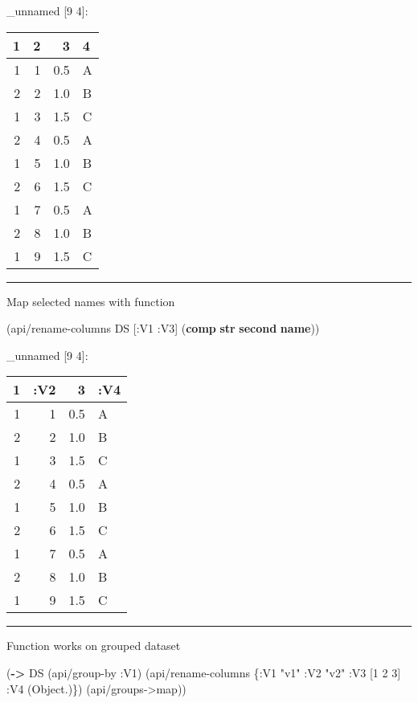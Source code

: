 \documentclass[]{article}
\newenvironment{Shaded}{\begin{snugshade}}{\end{snugshade}}
\newcommand{\KeywordTok}[1]{\textcolor[rgb]{0.13,0.29,0.53}{\textbf{#1}}}
\newcommand{\DecValTok}[1]{\textcolor[rgb]{0.00,0.00,0.81}{#1}}
\newcommand{\StringTok}[1]{\textcolor[rgb]{0.31,0.60,0.02}{#1}}
\newcommand{\AttributeTok}[1]{\textcolor[rgb]{0.77,0.63,0.00}{#1}}
\newcommand{\NormalTok}[1]{#1}
\begin{document}
\_unnamed {[}9 4{]}:

\begin{longtable}[]{@{}rrrl@{}}
\toprule
1 & 2 & 3 & 4\tabularnewline
\midrule
\endhead
1 & 1 & 0.5 & A\tabularnewline
2 & 2 & 1.0 & B\tabularnewline
1 & 3 & 1.5 & C\tabularnewline
2 & 4 & 0.5 & A\tabularnewline
1 & 5 & 1.0 & B\tabularnewline
2 & 6 & 1.5 & C\tabularnewline
1 & 7 & 0.5 & A\tabularnewline
2 & 8 & 1.0 & B\tabularnewline
1 & 9 & 1.5 & C\tabularnewline
\bottomrule
\end{longtable}

\begin{center}\rule{0.5\linewidth}{0.5pt}\end{center}

Map selected names with function

\begin{Shaded}
\begin{Highlighting}[]
\NormalTok{(api/rename-columns DS [}\AttributeTok{:V1} \AttributeTok{:V3}\NormalTok{] (}\KeywordTok{comp} \KeywordTok{str} \KeywordTok{second} \KeywordTok{name}\NormalTok{))}
\end{Highlighting}
\end{Shaded}

\_unnamed {[}9 4{]}:

\begin{longtable}[]{@{}rrrl@{}}
\toprule
1 & :V2 & 3 & :V4\tabularnewline
\midrule
\endhead
1 & 1 & 0.5 & A\tabularnewline
2 & 2 & 1.0 & B\tabularnewline
1 & 3 & 1.5 & C\tabularnewline
2 & 4 & 0.5 & A\tabularnewline
1 & 5 & 1.0 & B\tabularnewline
2 & 6 & 1.5 & C\tabularnewline
1 & 7 & 0.5 & A\tabularnewline
2 & 8 & 1.0 & B\tabularnewline
1 & 9 & 1.5 & C\tabularnewline
\bottomrule
\end{longtable}

\begin{center}\rule{0.5\linewidth}{0.5pt}\end{center}

Function works on grouped dataset

\begin{Shaded}
\begin{Highlighting}[]
\NormalTok{(}\KeywordTok{->}\NormalTok{ DS}
\NormalTok{    (api/group-by }\AttributeTok{:V1}\NormalTok{)}
\NormalTok{    (api/rename-columns \{}\AttributeTok{:V1} \StringTok{"v1"}
                         \AttributeTok{:V2} \StringTok{"v2"}
                         \AttributeTok{:V3}\NormalTok{ [}\DecValTok{1} \DecValTok{2} \DecValTok{3}\NormalTok{]}
                         \AttributeTok{:V4}\NormalTok{ (Object.)\})}
\NormalTok{    (api/groups->map))}
\end{Highlighting}
\end{Shaded}
\end{document}
